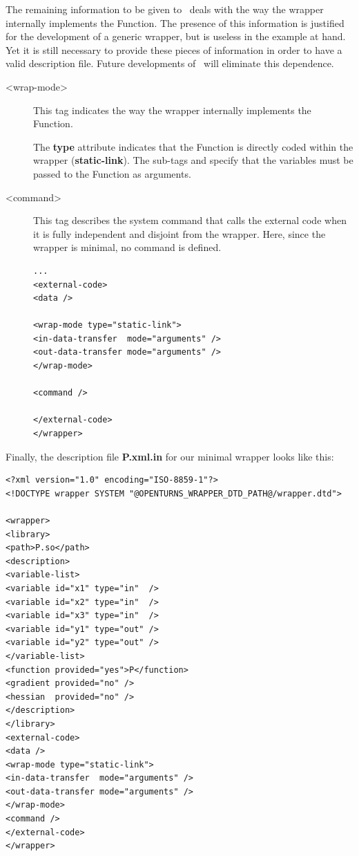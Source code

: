The remaining information to be given to \OT\ deals with the way the wrapper internally implements the Function. The presence of this information is justified for the development of a generic wrapper, but is useless in the example at hand. Yet it is still necessary to provide these pieces of information in order to have a valid description file. Future developments of \OT\ will eliminate this dependence.

\begin{description}
\item[<wrap-mode>] This tag indicates the way the wrapper internally implements the Function.

The {\bf type} attribute indicates that the Function is directly coded within the wrapper ({\bf static-link}). The sub-tags {\bf <in-data-transfer>} and {\bf<out-data-transfer>} specify that the variables must be passed to the Function as arguments.

\item[<command>] This tag describes the system command that calls the external code when it is fully independent and disjoint from the wrapper. Here, since the wrapper is minimal, no command is defined.

\lstset{language=XML, basicstyle=\normalsize}
\begin{lstlisting}[frame=TBRL]
...
<external-code>
<data />

<wrap-mode type="static-link">
<in-data-transfer  mode="arguments" />
<out-data-transfer mode="arguments" />
</wrap-mode>

<command />

</external-code>
</wrapper>
\end{lstlisting}
\end{description}

Finally, the description file {\bf P.xml.in} for our minimal wrapper looks like this:
\lstset{language=XML, basicstyle=\normalsize}
\begin{lstlisting}[frame=TBRL]
<?xml version="1.0" encoding="ISO-8859-1"?>
<!DOCTYPE wrapper SYSTEM "@OPENTURNS_WRAPPER_DTD_PATH@/wrapper.dtd">

<wrapper>
<library>
<path>P.so</path>
<description>
<variable-list>
<variable id="x1" type="in"  />
<variable id="x2" type="in"  />
<variable id="x3" type="in"  />
<variable id="y1" type="out" />
<variable id="y2" type="out" />
</variable-list>
<function provided="yes">P</function>
<gradient provided="no" />
<hessian  provided="no" />
</description>
</library>
<external-code>
<data />
<wrap-mode type="static-link">
<in-data-transfer  mode="arguments" />
<out-data-transfer mode="arguments" />
</wrap-mode>
<command />
</external-code>
</wrapper>
\end{lstlisting}

